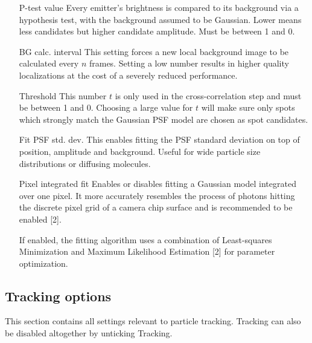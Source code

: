 \documentclass[11pt,onside]{report}
\makeatletter
\numberwithin{equation}{chapter}
\gdef\tshortstack{\@ifnextchar[\@tshortstack{\@tshortstack[c]}}
\gdef\@tshortstack[#1]{%
  \leavevmode
  \vtop\bgroup
    \baselineskip-\p@\lineskip 3\p@
    \let\mb@l\hss\let\mb@r\hss
    \expandafter\let\csname mb@#1\endcsname\relax
    \let\\\@stackcr
    \@ishortstack}
\makeatother
\begin{document}
\begin{itemize}[leftmargin=2cm]
\item[P-test value] Every emitter's brightness is compared to its background via a hypothesis test, with the background assumed to be Gaussian. Lower means less candidates but higher candidate amplitude. Must be between 1 and 0.
\item[BG calc. interval] This setting forces a new local background image to be calculated every $n$ frames. Setting a low number results in higher quality localizations at the cost of a severely reduced performance.
\item[Threshold] This number $t$ is only used in the cross-correlation step and must be between 1 and 0. Choosing a large value for $t$ will make sure only spots which strongly match the Gaussian PSF model are chosen as spot candidates.\\[0pt]%
%
\item[Fit PSF std. dev.] This enables fitting the PSF standard deviation on top of position, amplitude and background. Useful for wide particle size distributions or diffusing molecules.
\item[Pixel integrated fit] Enables or disables fitting a Gaussian model integrated over one pixel. It more accurately resembles the process of photons hitting the discrete pixel grid of a camera chip surface and is recommended to be enabled [2].
\item[\smash{\tshortstack[1]{Maximum Likeli- \\hood refinement}}] If enabled, the fitting algorithm uses a combination of Least-squares Minimization and Maximum Likelihood Estimation [2] for parameter optimization.
\end{itemize}

\subsection*{Tracking options}
This section contains all settings relevant to particle tracking. Tracking can also be disabled altogether by unticking \textsf{Tracking}.
\end{document}
